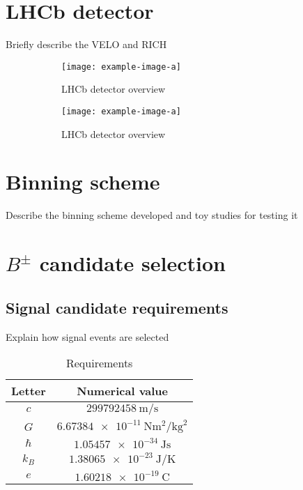 \documentclass[12pt, a4paper, notitlepage, onecolumn]{article}
\numberwithin{equation}{section}
\begin{document}
\section{LHCb detector}
\noindent Briefly describe the VELO and RICH

\begin{figure}[H] 
  \centering
  \begin{subfigure}{0.5\textwidth}
    \centering
    \texttt{[image: example-image-a]}
    \caption{LHCb detector overview}
  \end{subfigure}%
  \begin{subfigure}{0.5\textwidth}
    \centering
    \texttt{[image: example-image-a]}
    \caption{LHCb detector overview}
  \end{subfigure}
  \caption{}
  \label{fig_lhcb_detector}
\end{figure}

\section{Binning scheme}
\noindent Describe the binning scheme developed and toy studies for testing it

\section{$B^\pm$ candidate selection}
\subsection{Signal candidate requirements}
\noindent Explain how signal events are selected

\begin{table}[H]
  \centering
  \caption{Requirements}
  \label{data}
  \begin{tabular}{cc} 
    \toprule
    Letter & Numerical value \\
    \midrule
    $c$ & $\SI{299792458}{\meter\per\second}$ \\
    $G$ & $\SI{6.67384e-11}{\newton\meter\squared\per\kilogram\squared}$ \\
    $\hbar$ & $\SI{1.05457e-34}{\joule\second}$ \\
    $k_B$ & $\SI{1.38065e-23}{\joule\per\kelvin}$ \\
    $e$ & $\SI{1.60218e-19}{\coulomb}$ \\
    \bottomrule
  \end{tabular}
\end{table}
\end{document}

